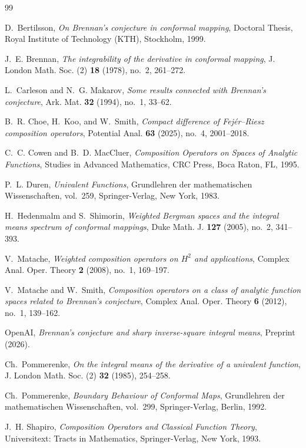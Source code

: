 \documentclass[12pt]{article}
\theoremstyle{definition}
\numberwithin{equation}{section}
\begin{document}
\begin{thebibliography}{99}

D.~Bertilsson, \emph{On Brennan's conjecture in conformal mapping}, Doctoral Thesis, Royal Institute of Technology (KTH), Stockholm, 1999.

J.~E. Brennan, \emph{The integrability of the derivative in conformal mapping}, J. London Math. Soc. (2) \textbf{18} (1978), no.~2, 261--272.

L.~Carleson and N.~G. Makarov, \emph{Some results connected with Brennan's conjecture}, Ark. Mat. \textbf{32} (1994), no.~1, 33--62.

B.~R. Choe, H.~Koo, and W.~Smith, \emph{Compact difference of Fej\'er--Riesz composition operators}, Potential Anal. \textbf{63} (2025), no.~4, 2001--2018.

C.~C. Cowen and B.~D. MacCluer, \emph{Composition Operators on Spaces of Analytic Functions}, Studies in Advanced Mathematics, CRC Press, Boca Raton, FL, 1995.

P.~L. Duren, \emph{Univalent Functions}, Grundlehren der mathematischen Wissenschaften, vol.~259, Springer-Verlag, New York, 1983.

H.~Hedenmalm and S.~Shimorin, \emph{Weighted Bergman spaces and the integral means spectrum of conformal mappings}, Duke Math. J. \textbf{127} (2005), no.~2, 341--393.

V.~Matache, \emph{Weighted composition operators on $H^2$ and applications}, Complex Anal. Oper. Theory \textbf{2} (2008), no.~1, 169--197.

V.~Matache and W.~Smith, \emph{Composition operators on a class of analytic function spaces related to Brennan's conjecture}, Complex Anal. Oper. Theory \textbf{6} (2012), no.~1, 139--162.

OpenAI, \emph{Brennan's conjecture and sharp inverse-square integral means}, Preprint (2026).

Ch.~Pommerenke, \emph{On the integral means of the derivative of a univalent function}, J. London Math. Soc. (2) \textbf{32} (1985), 254--258.

Ch.~Pommerenke, \emph{Boundary Behaviour of Conformal Maps}, Grundlehren der mathematischen Wissenschaften, vol.~299, Springer-Verlag, Berlin, 1992.

J.~H. Shapiro, \emph{Composition Operators and Classical Function Theory}, Universitext: Tracts in Mathematics, Springer-Verlag, New York, 1993.


\end{thebibliography}
\end{document}
